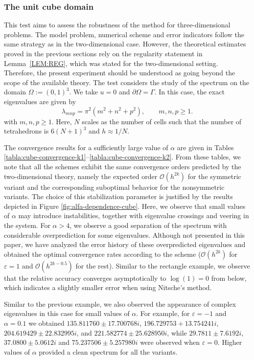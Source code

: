 \documentclass[onefignum,onetabnum,final]{siamart250211}
\numberwithin{equation}{section}
\newcommand\0{\boldsymbol{0}}
\begin{document}
	\subsubsection{The unit cube domain}\label{subsec:cube-domain}
	This test aims to assess the robustness of the method for three-dimensional problems. The model problem, numerical scheme and error indicators follow the same strategy as in the two-dimensional case. However, the theoretical estimates proved in the previous sections rely on the regularity statement in Lemma~\ref{LEM:REG}, which was stated for the two-dimensional setting. Therefore, the present experiment should be understood as going beyond the scope of the available theory. The test considers the study of the spectrum on the domain $\Omega:=(0,1)^3$. We take $u=0$ and $\partial\Omega=\Gamma$. In this case, the exact eigenvalues are given by
	$$
	\lambda_{mnp}=\pi^2(m^2+n^2+p^2),\qquad m,n,p\geq 1.
	$$
	with $m,n,p\geq 1$.  Here, $N$ scales as the number of cells such that the number of tetrahedrons is $6(N +1)^3$ and $h\approx 1/N$. 
	
	The convergence results for a sufficiently large value of $\alpha$ are given in Tables \ref{tabla:cube-convergence-k1}--\ref{tabla:cube-convergence-k2}. From these tables, we note that all the schemes exhibit the same convergence orders predicted by the two-dimensional theory, namely the expected order $\mathcal{O}(h^{2k})$ for the symmetric variant and the corresponding suboptimal behavior for the nonsymmetric variants. The choice of this stabilization parameter is justified by the results depicted in Figure \ref{fig:alfa-dependence-cube}. Here, we observe that small values of $\alpha$ may introduce instabilities, together with eigenvalue crossings and veering in the system. For $\alpha > 4$, we observe a good separation of the spectrum with considerable overprediction for some eigenvalues. Although not presented in this paper, we have analyzed the error history of these overpredicted eigenvalues and obtained the optimal convergence rates according to the scheme ($\mathcal{O}(h^{2k})$ for $\varepsilon=1$ and $\mathcal{O}(h^{2k-0.5})$ for the rest). Similar to the rectangle example, we observe that the relative accuracy converges asymptotically to $\log(1)=0$ from below, which indicates a slightly smaller error when using Nitsche's method.
	
	
	Similar to the previous example, we also observed the appearance of complex eigenvalues in this case for small values of $\alpha$. For example, for $\varepsilon=-1$ and $\alpha=0.1$ we obtained $135.811760\pm17.700768 i$, $196.729753+13.754241i$, $204.619429\pm22.832995i$, and $221.582774\pm25.628950i$,  while $29.7811 \pm 7.6192 i$, $37.0800 \pm 5.0612 i$ and $75.237506\pm5.257980i$ were observed when $\varepsilon=0$. Higher values of $\alpha$ provided a clean spectrum for all the variants.
	
\end{document}
